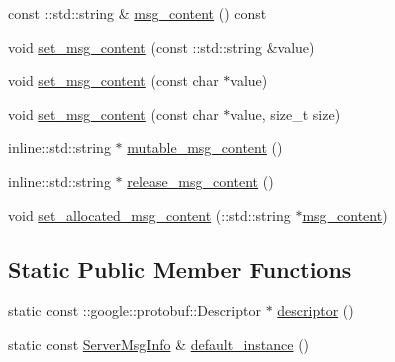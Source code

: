 \begin{DoxyCompactItemize}
\item 
const \+::std\+::string \& \hyperlink{class_i_m_1_1_base_define_1_1_server_msg_info_a9bfe88f34f25b01c51bab8ddc81e5b17}{msg\+\_\+content} () const 
\item 
void \hyperlink{class_i_m_1_1_base_define_1_1_server_msg_info_ae6a01e2b20f5b6107b589b0f2e75bab2}{set\+\_\+msg\+\_\+content} (const \+::std\+::string \&value)
\item 
void \hyperlink{class_i_m_1_1_base_define_1_1_server_msg_info_a97326b0fafea1c87edbded44891d6024}{set\+\_\+msg\+\_\+content} (const char $\ast$value)
\item 
void \hyperlink{class_i_m_1_1_base_define_1_1_server_msg_info_afa10ba4371d90dc83f3397e99fdf6452}{set\+\_\+msg\+\_\+content} (const char $\ast$value, size\+\_\+t size)
\item 
inline\+::std\+::string $\ast$ \hyperlink{class_i_m_1_1_base_define_1_1_server_msg_info_aa90dc05dfd9a590e3a9da51e20761d7a}{mutable\+\_\+msg\+\_\+content} ()
\item 
inline\+::std\+::string $\ast$ \hyperlink{class_i_m_1_1_base_define_1_1_server_msg_info_ae37bc63915ecbbb7aa670571815ffe9f}{release\+\_\+msg\+\_\+content} ()
\item 
void \hyperlink{class_i_m_1_1_base_define_1_1_server_msg_info_aaa0d55a5ec4aaf03e360c1e742f4d333}{set\+\_\+allocated\+\_\+msg\+\_\+content} (\+::std\+::string $\ast$\hyperlink{class_i_m_1_1_base_define_1_1_server_msg_info_a9bfe88f34f25b01c51bab8ddc81e5b17}{msg\+\_\+content})
\end{DoxyCompactItemize}
\subsection*{Static Public Member Functions}
\begin{DoxyCompactItemize}
\item 
static const \+::google\+::protobuf\+::\+Descriptor $\ast$ \hyperlink{class_i_m_1_1_base_define_1_1_server_msg_info_a158b03415f3af14a66c47fcfda8b8860}{descriptor} ()
\item 
static const \hyperlink{class_i_m_1_1_base_define_1_1_server_msg_info}{Server\+Msg\+Info} \& \hyperlink{class_i_m_1_1_base_define_1_1_server_msg_info_a0dc2529d83693aa4a8452475f2b85373}{default\+\_\+instance} ()
\end{DoxyCompactItemize}
